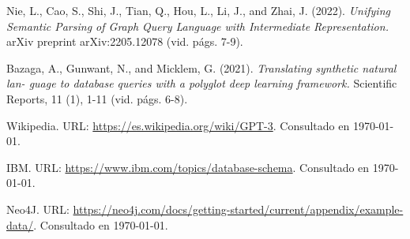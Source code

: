 \documentclass[a4paper,10pt,twocolumn]{article}
\begin{document}
\begin{thebibliography}{99}
	 Nie, L., Cao, S., Shi, J., Tian, Q., Hou, L., Li, J., and Zhai, J. (2022). \emph{Unifying Semantic Parsing of Graph Query Language with Intermediate Representation.}
		arXiv preprint arXiv:2205.12078 (vid. págs. 7-9).

	 Bazaga, A., Gunwant, N., and Micklem, G. (2021). \emph{Translating synthetic natural lan-
	guage to database queries with a polyglot deep learning framework.}
		Scientific Reports, 11 (1), 1-11 (vid. págs. 6-8).

	 Wikipedia. URL: \href{https://es.wikipedia.org/wiki/GPT-3}
	  {https://es.wikipedia.org/wiki/GPT-3}.
		Consultado en \today.

	 IBM. URL: \href{https://www.ibm.com/topics/database-schema}
	  {https://www.ibm.com/topics/database-schema}.
		Consultado en \today.

		 Neo4J. URL: \href{https://neo4j.com/docs/getting-started/current/appendix/example-data/}
	  {https://neo4j.com/docs/getting-started/current/appendix/example-data/}.
		Consultado en \today.

\end{thebibliography}

\end{document}
